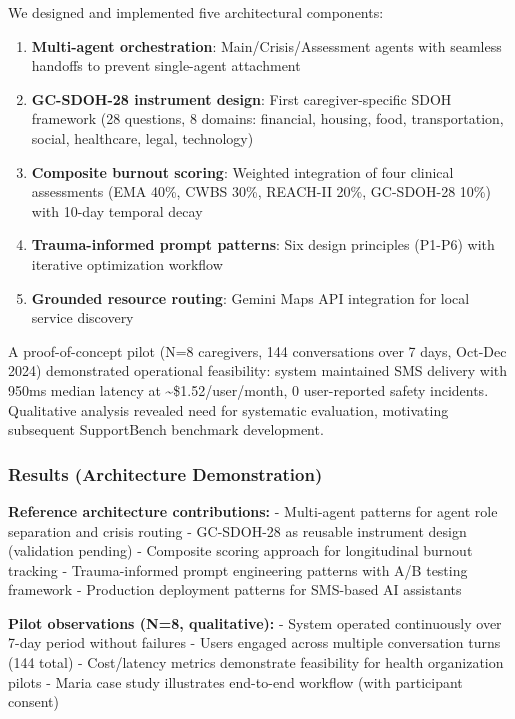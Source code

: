 \documentclass[
]{article}
\providecommand{\tightlist}{%
  \setlength{\itemsep}{0pt}\setlength{\parskip}{0pt}}
\begin{document}
We designed and implemented five architectural components:

\begin{enumerate}
\def\labelenumi{\arabic{enumi}.}
\tightlist
\item
  \textbf{Multi-agent orchestration}: Main/Crisis/Assessment agents with
  seamless handoffs to prevent single-agent attachment
\item
  \textbf{GC-SDOH-28 instrument design}: First caregiver-specific SDOH
  framework (28 questions, 8 domains: financial, housing, food,
  transportation, social, healthcare, legal, technology)
\item
  \textbf{Composite burnout scoring}: Weighted integration of four
  clinical assessments (EMA 40\%, CWBS 30\%, REACH-II 20\%, GC-SDOH-28
  10\%) with 10-day temporal decay
\item
  \textbf{Trauma-informed prompt patterns}: Six design principles
  (P1-P6) with iterative optimization workflow
\item
  \textbf{Grounded resource routing}: Gemini Maps API integration for
  local service discovery
\end{enumerate}

A proof-of-concept pilot (N=8 caregivers, 144 conversations over 7 days,
Oct-Dec 2024) demonstrated operational feasibility: system maintained
SMS delivery with 950ms median latency at
\textasciitilde\$1.52/user/month, 0 user-reported safety incidents.
Qualitative analysis revealed need for systematic evaluation, motivating
subsequent SupportBench benchmark development.

\subsubsection{Results (Architecture
Demonstration)}\label{results-architecture-demonstration}

\textbf{Reference architecture contributions:} - Multi-agent patterns
for agent role separation and crisis routing - GC-SDOH-28 as reusable
instrument design (validation pending) - Composite scoring approach for
longitudinal burnout tracking - Trauma-informed prompt engineering
patterns with A/B testing framework - Production deployment patterns for
SMS-based AI assistants

\textbf{Pilot observations (N=8, qualitative):} - System operated
continuously over 7-day period without failures - Users engaged across
multiple conversation turns (144 total) - Cost/latency metrics
demonstrate feasibility for health organization pilots - Maria case
study illustrates end-to-end workflow (with participant consent)
\end{document}
